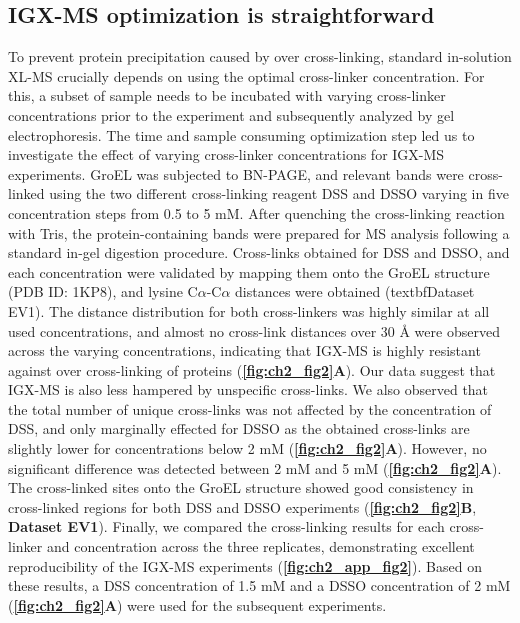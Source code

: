 \subsection*{IGX-MS optimization is straightforward}
To prevent protein precipitation caused by over cross-linking, standard in-solution XL-MS crucially depends on using the optimal cross-linker concentration. For this, a subset of sample needs to be incubated with varying cross-linker concentrations prior to the experiment and subsequently analyzed by gel electrophoresis. The time and sample consuming optimization step led us to investigate the effect of varying cross-linker concentrations for IGX-MS experiments. GroEL was subjected to BN-PAGE, and relevant bands were cross-linked using the two different cross-linking reagent DSS and DSSO varying in five concentration steps from 0.5 to 5 mM. After quenching the cross-linking reaction with Tris, the protein-containing bands were prepared for MS analysis following a standard in-gel digestion procedure. Cross-links obtained for DSS and DSSO, and each concentration were validated by mapping them onto the GroEL structure (PDB ID: 1KP8), and lysine C$\alpha$-C$\alpha$ distances were obtained (textbf{Dataset EV1}). The distance distribution for both cross-linkers was highly similar at all used concentrations, and almost no cross-link distances over 30 Å were observed across the varying concentrations, indicating that IGX-MS is highly resistant against over cross-linking of proteins (\textbf{\autoref{fig:ch2_fig2}A}). Our data suggest that IGX-MS is also less hampered by unspecific cross-links. We also observed that the total number of unique cross-links was not affected by the concentration of DSS, and only marginally effected for DSSO as the obtained cross-links are slightly lower for concentrations below 2 mM (\textbf{\autoref{fig:ch2_fig2}A}). However, no significant difference was detected between 2 mM and 5 mM (\textbf{\autoref{fig:ch2_fig2}A}). The cross-linked sites onto the GroEL structure showed good consistency in cross-linked regions for both DSS and DSSO experiments (\textbf{\autoref{fig:ch2_fig2}B}, \textbf{Dataset EV1}). Finally, we compared the cross-linking results for each cross-linker and concentration across the three replicates, demonstrating excellent reproducibility of the IGX-MS experiments (\textbf{\autoref{fig:ch2_app_fig2}}). Based on these results, a DSS concentration of 1.5 mM and a DSSO concentration of 2 mM (\textbf{\autoref{fig:ch2_fig2}A}) were used for the subsequent experiments.
\clearpage
